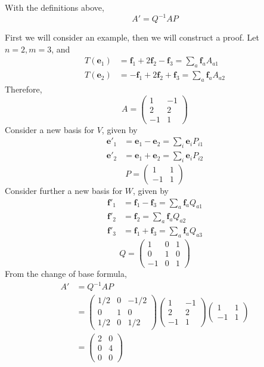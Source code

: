 \documentclass{article}
\begin{document}
\begin{proposition}
	With the definitions above,
	\[ A' = Q^{-1}AP \]
\end{proposition}
\noindent First we will consider an example, then we will construct a proof. Let $n=2, m=3$, and
\begin{align*}
	T(\bm e_1) & = \bm f_1 + 2\bm f_2 - \bm f_3 = \sum_a \bm f_a A_{a1}  \\
	T(\bm e_2) & = -\bm f_1 + 2\bm f_2 + \bm f_3 = \sum_a \bm f_a A_{a2}
\end{align*}
Therefore,
\[ A = \begin{pmatrix}
		1 & -1 \\ 2 & 2 \\ -1 & 1
	\end{pmatrix} \]
Consider a new basis for $V$, given by
\begin{align*}
	\bm e'_1 & = \bm e_1 - \bm e_2 = \sum_i \bm e_i P_{i1} \\
	\bm e'_2 & = \bm e_1 + \bm e_2 = \sum_i \bm e_i P_{i2}
\end{align*}
\[ P = \begin{pmatrix}
		1 & 1 \\ -1 & 1
	\end{pmatrix} \]
Consider further a new basis for $W$, given by
\begin{align*}
	\bm f'_1 & = \bm f_1 - \bm f_3 = \sum_a \bm f_a Q_{a1} \\
	\bm f'_2 & = \bm f_2 = \sum_a \bm f_a Q_{a2}           \\
	\bm f'_3 & = \bm f_1 + \bm f_3 = \sum_a \bm f_a Q_{a3}
\end{align*}
\[ Q = \begin{pmatrix}
		1  & 0 & 1 \\
		0  & 1 & 0 \\
		-1 & 0 & 1
	\end{pmatrix} \]
From the change of base formula,
\begin{align*}
	A' & = Q^{-1}AP                                                                          \\
	   & = \begin{pmatrix}
		1/2 & 0 & -1/2 \\
		0   & 1 & 0    \\
		1/2 & 0 & 1/2
	\end{pmatrix}\begin{pmatrix}
		1 & -1 \\ 2 & 2 \\ -1 & 1
	\end{pmatrix}\begin{pmatrix}
		1 & 1 \\ -1 & 1
	\end{pmatrix} \\
	   & = \begin{pmatrix}
		2 & 0 \\ 0 & 4 \\ 0 & 0
	\end{pmatrix}
\end{align*}
\end{document}
